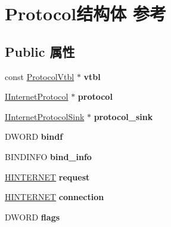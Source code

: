 \hypertarget{struct_protocol}{}\section{Protocol结构体 参考}
\label{struct_protocol}
\subsection*{Public 属性}
\begin{DoxyCompactItemize}
\item 
\mbox{\label{struct_protocol_a86560751dd4957ed2d09065bf6093da7}} 
const \hyperlink{struct_protocol_vtbl}{Protocol\+Vtbl} $\ast$ {\bfseries vtbl}
\item 
\mbox{\label{struct_protocol_ab418fd6d8f2c0385663e2769b07ae3ce}} 
\hyperlink{interface_i_internet_protocol}{I\+Internet\+Protocol} $\ast$ {\bfseries protocol}
\item 
\mbox{\label{struct_protocol_ac4654c7ce772fc9fc5b22d0a0d379df8}} 
\hyperlink{interface_i_internet_protocol_sink}{I\+Internet\+Protocol\+Sink} $\ast$ {\bfseries protocol\+\_\+sink}
\item 
\mbox{\label{struct_protocol_a06c10eefcf1c167c738ea6f069d3c765}} 
D\+W\+O\+RD {\bfseries bindf}
\item 
\mbox{\label{struct_protocol_a868193933ed8c7a0a7e66f0c96d3fc6c}} 
B\+I\+N\+D\+I\+N\+FO {\bfseries bind\+\_\+info}
\item 
\mbox{\label{struct_protocol_a36eb13a5efd47dca4d085c9355809975}} 
\hyperlink{interfacevoid}{H\+I\+N\+T\+E\+R\+N\+ET} {\bfseries request}
\item 
\mbox{\label{struct_protocol_a82c815998adc0cc5c6d7cda1ef560f60}} 
\hyperlink{interfacevoid}{H\+I\+N\+T\+E\+R\+N\+ET} {\bfseries connection}
\item 
\mbox{\label{struct_protocol_a13b3bb1b7cfd3199fdc833d30c8cced2}} 
D\+W\+O\+RD {\bfseries flags}
\item 
\mbox{\label{struct_protocol_afd45639a813e24283ebdfdabbb8575a8}} 

\end{DoxyCompactItemize}
